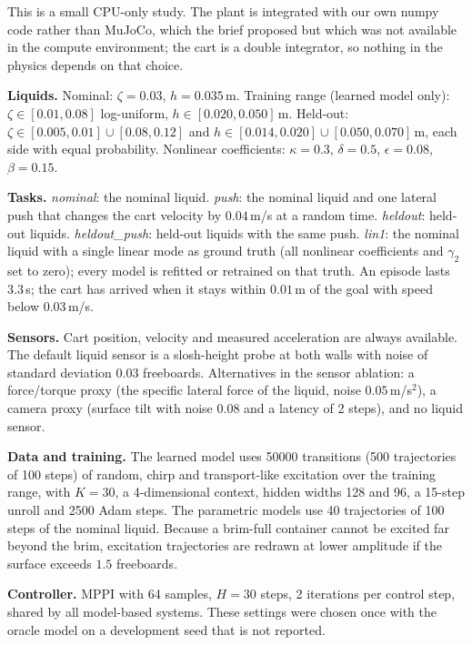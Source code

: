 This is a small CPU-only study. The plant is integrated with our own numpy code rather than MuJoCo, which the brief proposed but which was not available in the compute environment; the cart is a double integrator, so nothing in the physics depends on that choice.

\textbf{Liquids.} Nominal: $\zeta=0.03$, $h=0.035$\,m. Training range (learned model only): $\zeta\in[0.01,0.08]$ log-uniform, $h\in[0.020,0.050]$\,m. Held-out: $\zeta\in[0.005,0.01]\cup[0.08,0.12]$ and $h\in[0.014,0.020]\cup[0.050,0.070]$\,m, each side with equal probability. Nonlinear coefficients: $\kappa=0.3$, $\delta=0.5$, $\epsilon=0.08$, $\beta=0.15$.

\textbf{Tasks.} \emph{nominal}: the nominal liquid. \emph{push}: the nominal liquid and one lateral push that changes the cart velocity by $0.04$\,m/s at a random time. \emph{heldout}: held-out liquids. \emph{heldout\_push}: held-out liquids with the same push. \emph{lin1}: the nominal liquid with a single linear mode as ground truth (all nonlinear coefficients and $\gamma_2$ set to zero); every model is refitted or retrained on that truth. An episode lasts $3.3$\,s; the cart has arrived when it stays within $0.01$\,m of the goal with speed below $0.03$\,m/s.

\textbf{Sensors.} Cart position, velocity and measured acceleration are always available. The default liquid sensor is a slosh-height probe at both walls with noise of standard deviation $0.03$ freeboards. Alternatives in the sensor ablation: a force/torque proxy (the specific lateral force of the liquid, noise $0.05$\,m/s$^2$), a camera proxy (surface tilt with noise $0.08$ and a latency of 2 steps), and no liquid sensor.

\textbf{Data and training.} The learned model uses 50000 transitions (500 trajectories of 100 steps) of random, chirp and transport-like excitation over the training range, with $K=30$, a 4-dimensional context, hidden widths 128 and 96, a 15-step unroll and 2500 Adam steps. The parametric models use 40 trajectories of 100 steps of the nominal liquid. Because a brim-full container cannot be excited far beyond the brim, excitation trajectories are redrawn at lower amplitude if the surface exceeds $1.5$ freeboards.

\textbf{Controller.} MPPI with 64 samples, $H=30$ steps, 2 iterations per control step, shared by all model-based systems. These settings were chosen once with the oracle model on a development seed that is not reported.

